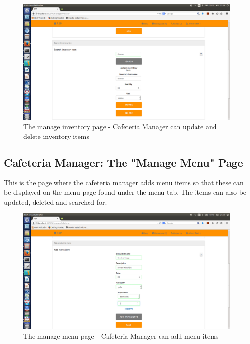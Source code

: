 \documentclass[a4paper,12pt]{article}
\begin{document}
\begin{figure}[H]
  \centering
    \includegraphics[width=1.0\textwidth]{screenshots/updateInv.png}
    \caption{The manage inventory page - Cafeteria Manager can update and delete inventory items}
\end{figure}

\subsection{Cafeteria Manager: The "Manage Menu" Page}
This is the page where the cafeteria manager adds menu items so that these can be displayed on the menu page found under the menu tab. The items can also be updated, deleted and searched for.

\begin{figure}[H]
  \centering
    \includegraphics[width=1.0\textwidth]{screenshots/addMenu.png}
    \caption{The manage menu page - Cafeteria Manager can add menu items}
\end{figure}
\end{document}
